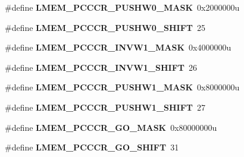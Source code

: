 \begin{DoxyCompactItemize}
\item 
\hypertarget{group___l_m_e_m___register___masks_ga3a45a5230e0c045021f45b42a4772180}{}\#define {\bfseries L\+M\+E\+M\+\_\+\+P\+C\+C\+C\+R\+\_\+\+P\+U\+S\+H\+W0\+\_\+\+M\+A\+S\+K}~0x2000000u\label{group___l_m_e_m___register___masks_ga3a45a5230e0c045021f45b42a4772180}

\item 
\hypertarget{group___l_m_e_m___register___masks_gaa8e17282f7b4ad84d915b18a12f8516c}{}\#define {\bfseries L\+M\+E\+M\+\_\+\+P\+C\+C\+C\+R\+\_\+\+P\+U\+S\+H\+W0\+\_\+\+S\+H\+I\+F\+T}~25\label{group___l_m_e_m___register___masks_gaa8e17282f7b4ad84d915b18a12f8516c}

\item 
\hypertarget{group___l_m_e_m___register___masks_gaa1fb551aa4c04fac149a176959f03d52}{}\#define {\bfseries L\+M\+E\+M\+\_\+\+P\+C\+C\+C\+R\+\_\+\+I\+N\+V\+W1\+\_\+\+M\+A\+S\+K}~0x4000000u\label{group___l_m_e_m___register___masks_gaa1fb551aa4c04fac149a176959f03d52}

\item 
\hypertarget{group___l_m_e_m___register___masks_gad4d63ffd20f8f883a93d1cd598a589ec}{}\#define {\bfseries L\+M\+E\+M\+\_\+\+P\+C\+C\+C\+R\+\_\+\+I\+N\+V\+W1\+\_\+\+S\+H\+I\+F\+T}~26\label{group___l_m_e_m___register___masks_gad4d63ffd20f8f883a93d1cd598a589ec}

\item 
\hypertarget{group___l_m_e_m___register___masks_ga4ce00f04c874eb87261d09c0f0baf000}{}\#define {\bfseries L\+M\+E\+M\+\_\+\+P\+C\+C\+C\+R\+\_\+\+P\+U\+S\+H\+W1\+\_\+\+M\+A\+S\+K}~0x8000000u\label{group___l_m_e_m___register___masks_ga4ce00f04c874eb87261d09c0f0baf000}

\item 
\hypertarget{group___l_m_e_m___register___masks_gadbaa50e8f931b2f35fc68e695f47b7ca}{}\#define {\bfseries L\+M\+E\+M\+\_\+\+P\+C\+C\+C\+R\+\_\+\+P\+U\+S\+H\+W1\+\_\+\+S\+H\+I\+F\+T}~27\label{group___l_m_e_m___register___masks_gadbaa50e8f931b2f35fc68e695f47b7ca}

\item 
\hypertarget{group___l_m_e_m___register___masks_ga526c4cebb582bf691530ac55b0dc57bb}{}\#define {\bfseries L\+M\+E\+M\+\_\+\+P\+C\+C\+C\+R\+\_\+\+G\+O\+\_\+\+M\+A\+S\+K}~0x80000000u\label{group___l_m_e_m___register___masks_ga526c4cebb582bf691530ac55b0dc57bb}

\item 
\hypertarget{group___l_m_e_m___register___masks_ga3d3f2157cfc4620f77d23c1a016fe143}{}\#define {\bfseries L\+M\+E\+M\+\_\+\+P\+C\+C\+C\+R\+\_\+\+G\+O\+\_\+\+S\+H\+I\+F\+T}~31\label{group___l_m_e_m___register___masks_ga3d3f2157cfc4620f77d23c1a016fe143}


\end{DoxyCompactItemize}
